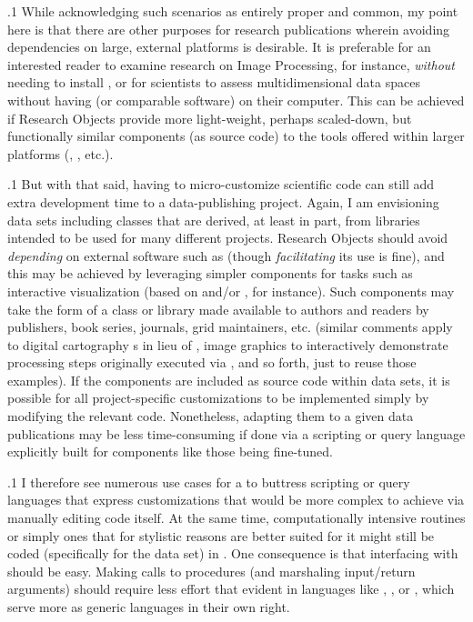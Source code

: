 \documentclass[11pt, twocolumn]{article}
\begin{document}
\p.1{%
While acknowledging such scenarios as entirely proper and
common, my point here is that there are other purposes
for research publications wherein avoiding
dependencies on large, external platforms is desirable.
It is preferable for an interested reader to
examine research on Image Processing, for instance,
\textit{without} needing to install , or for
scientists to assess multidimensional data spaces
without having  (or comparable software)
on their computer. This can be achieved
if Research Objects provide more light-weight, perhaps
scaled-down, but functionally similar components
(as source code) to the tools offered within
larger platforms (, , etc.).
}%

\p.1{%
But with that said, having to micro-customize
scientific  code can still add extra development
time to a data-publishing project. Again, I am
envisioning data sets including  classes that
are derived, at least in part, from libraries
intended to be used for many different projects.
Research Objects should avoid \textit{depending} on
external software such as  (though
\textit{facilitating} its use is fine), and this
may be achieved by leveraging simpler components
for tasks such as interactive  visualization
(based on  and/or , for instance).
Such components may take the form of a class or 
library made available to authors and readers by publishers, book series,
journals, grid maintainers, etc. (similar comments apply
to digital cartography s in lieu of , image graphics
to interactively demonstrate processing steps
originally executed via , and so forth, just
to reuse those examples). If the components are
included as source code within data sets, it is
possible for all project-specific customizations to be
implemented simply by modifying the relevant  code.
Nonetheless, adapting them to a given data publications
may be less time-consuming if done via a scripting
or query language explicitly built for components
like those being fine-tuned.
}%

\p.1{%
I therefore see numerous use cases for a  to buttress
scripting or query languages that express
customizations that would be more complex
to achieve via manually editing  code itself.
At the same time, computationally intensive routines
\mdash{} or simply ones that for stylistic reasons are
better suited for it \mdash{} might still be
coded (specifically for the data set) in .
One consequence is that interfacing with
 should be easy. Making calls to  procedures
(and marshaling input/return arguments) should
require less effort that evident in languages
like , , or , which
serve more as generic languages in their own right.
}%
\end{document}
